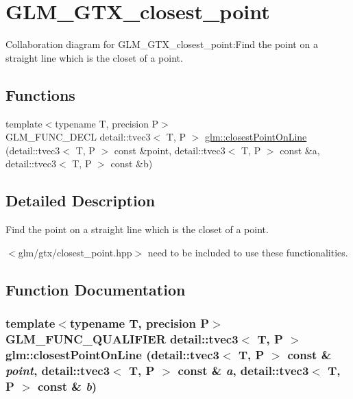 \hypertarget{group__gtx__closest__point}{
\section{GLM\_\-GTX\_\-closest\_\-point}
\label{group__gtx__closest__point}
}


Collaboration diagram for GLM\_\-GTX\_\-closest\_\-point:Find the point on a straight line which is the closet of a point.  
\subsection*{Functions}
\begin{CompactItemize}
\item 
{\footnotesize template$<$typename T, precision P$>$ }\\GLM\_\-FUNC\_\-DECL detail::tvec3$<$ T, P $>$ \hyperlink{group__gtx__closest__point_g2fe2729eb32015953823c96c2e15daf9}{glm::closestPointOnLine} (detail::tvec3$<$ T, P $>$ const \&point, detail::tvec3$<$ T, P $>$ const \&a, detail::tvec3$<$ T, P $>$ const \&b)
\end{CompactItemize}


\subsection{Detailed Description}
Find the point on a straight line which is the closet of a point. 

$<$glm/gtx/closest\_\-point.hpp$>$ need to be included to use these functionalities. 

\subsection{Function Documentation}
\hypertarget{group__gtx__closest__point_g2fe2729eb32015953823c96c2e15daf9}{
\subsubsection[closestPointOnLine]{\setlength{\rightskip}{0pt plus 5cm}template$<$typename T, precision P$>$ GLM\_\-FUNC\_\-QUALIFIER detail::tvec3$<$ T, P $>$ glm::closestPointOnLine (detail::tvec3$<$ T, P $>$ const \& {\em point}, \/  detail::tvec3$<$ T, P $>$ const \& {\em a}, \/  detail::tvec3$<$ T, P $>$ const \& {\em b})}}
\label{group__gtx__closest__point_g2fe2729eb32015953823c96c2e15daf9}


